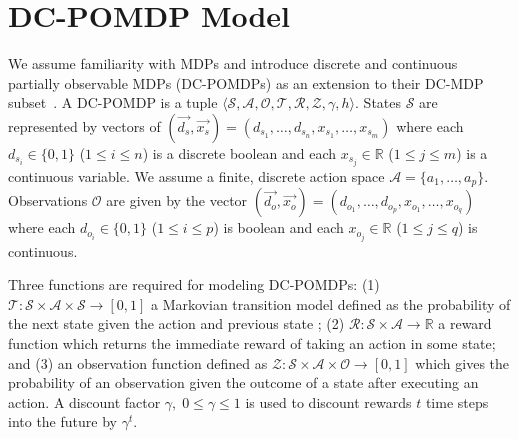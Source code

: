 \documentclass{article} %
\begin{document}
\section{DC-POMDP Model} 

We assume familiarity with MDPs and introduce discrete and continuous
partially observable MDPs (DC-POMDPs) as an extension to their DC-MDP
subset~\cite{sanner_uai11}.  A DC-POMDP is a tuple $\langle
\mathcal{S},\mathcal{A},\mathcal{O},\mathcal{T},\mathcal{R},\mathcal{Z},\gamma,h
\rangle$.  States $\mathcal{S}$ are represented by vectors of
$(\vec{d_s},\vec{x_s}) = (
d_{s_1},\ldots,d_{s_n},x_{s_1},\ldots,x_{s_m} )$ where each $d_{s_i}
\in \{ 0,1 \}$ ($1 \leq i \leq n$) is a discrete boolean and each
$x_{s_j} \in \mathbb{R}$ ($1 \leq j \leq m$) is a continuous variable.
We assume a finite, discrete action space $\mathcal{A} = \{ a_1,
\ldots, a_p \}$. Observations
$\mathcal{O}$ are given by the vector $(\vec{d_o},\vec{x_o}) = (
d_{o_1},\ldots,d_{o_p},x_{o_1},\ldots,x_{o_q} )$ where each $d_{o_i}
\in \{ 0,1 \}$ ($1 \leq i \leq p$) is boolean and each $x_{o_j} \in
\mathbb{R}$ ($1 \leq j \leq q$) is continuous.

Three functions are required for modeling DC-POMDPs: (1) $\mathcal{T}: \mathcal{S} \times \mathcal{A} \times \mathcal{S} \rightarrow  [ 0, 1 ]$ a Markovian transition model defined as the probability of the next state given the action and previous state%
; (2)  $\mathcal{R}:\mathcal{S}\times\mathcal{A} \rightarrow \mathbb{R}$ a reward function which returns the immediate reward of taking an action in some state; and (3) an observation function defined as $\mathcal{Z} : \mathcal{S} \times \mathcal{A} \times \mathcal{O} \rightarrow [ 0, 1 ]$  which gives the probability of an observation given the outcome of a state after executing an action.  A discount factor $\gamma, \; 0 \leq \gamma \leq 1$ is used to discount rewards $t$ time steps into the future by $\gamma^t$.
\end{document}
